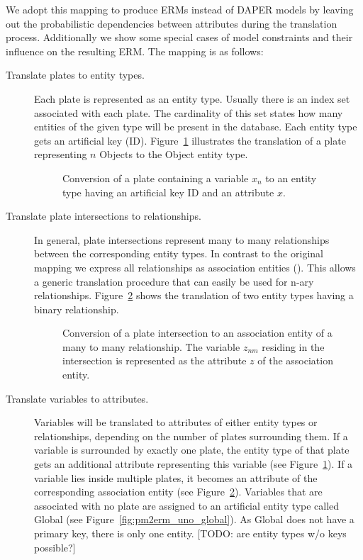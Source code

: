 We adopt this mapping to produce ERMs instead of DAPER models by leaving out the probabilistic dependencies between attributes during the translation process. Additionally we show some special cases of model constraints and their influence on the resulting ERM. The mapping is as follows:

\begin{description}
\item[Translate plates to entity types.] Each plate is represented as an entity type. Usually there is an index set associated with each plate. The cardinality of this set states how many entities of the given type will be present in the database. Each entity type gets an artificial key (ID). Figure~\ref{fig:pm2erm_uno_local} illustrates the translation of a plate representing $n$ Objects to the Object entity type.

\begin{figure}[t]
\centering
\scalebox{\tikzScale}{\adjustTikzSize }
\caption{Conversion of a plate containing a variable $x_n$ to an entity type having an artificial key ID and an attribute $x$.}\label{fig:pm2erm_uno_local}
\end{figure}

\item[Translate plate intersections to relationships.] In general, plate intersections represent many to many relationships between the corresponding entity types. In contrast to the original mapping we express all relationships as association entities (\cite[p.~86-88]{elmasri2007database}). This allows a generic translation procedure that can easily be used for n-ary relationships. Figure~\ref{fig:pm2erm_bi_noconstraints} shows the translation of two entity types having a binary relationship.

\begin{figure}[t]
\centering
\scalebox{\tikzScale}{\adjustTikzSize }
\caption{Conversion of a plate intersection to an association entity of a many to many relationship. The variable $z_{nm}$ residing in the intersection is represented as the attribute $z$ of the association entity.}\label{fig:pm2erm_bi_noconstraints}
\end{figure}

\item[Translate variables to attributes.] Variables will be translated to attributes of either entity types or relationships, depending on the number of plates surrounding them. If a variable is surrounded by exactly one plate, the entity type of that plate gets an additional attribute representing this variable (see Figure~\ref{fig:pm2erm_uno_local}). If a variable lies inside multiple plates, it becomes an attribute of the corresponding association entity (see Figure~\ref{fig:pm2erm_bi_noconstraints}). Variables that are associated with no plate are assigned to an artificial entity type called Global (see Figure~\ref{fig:pm2erm_uno_global}). As Global does not have a primary key, there is only one entity. [TODO: are entity types w/o keys possible?]


\end{description}
